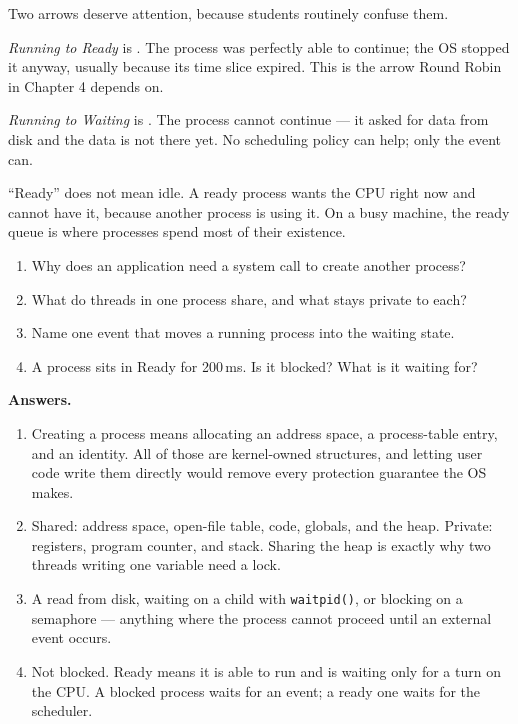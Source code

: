 Two arrows deserve attention, because students routinely confuse them.

\emph{Running to Ready} is . The process was perfectly able to continue; the OS stopped it anyway, usually because its time slice expired. This is the arrow Round Robin in Chapter 4 depends on.

\emph{Running to Waiting} is . The process cannot continue --- it asked for data from disk and the data is not there yet. No scheduling policy can help; only the event can.

\begin{pitfall}
``Ready'' does not mean idle. A ready process wants the CPU right now and cannot have it, because another process is using it. On a busy machine, the ready queue is where processes spend most of their existence.
\end{pitfall}

\begin{quickcheck}
\begin{enumerate}
  \item Why does an application need a system call to create another process?
  \item What do threads in one process share, and what stays private to each?
  \item Name one event that moves a running process into the waiting state.
  \item A process sits in Ready for 200\,ms. Is it blocked? What is it waiting for?
\end{enumerate}

\medskip\noindent\textbf{Answers.}
\begin{enumerate}
  \item Creating a process means allocating an address space, a process-table entry, and an identity. All of those are kernel-owned structures, and letting user code write them directly would remove every protection guarantee the OS makes.
  \item Shared: address space, open-file table, code, globals, and the heap. Private: registers, program counter, and stack. Sharing the heap is exactly why two threads writing one variable need a lock.
  \item A read from disk, waiting on a child with \texttt{waitpid()}, or blocking on a semaphore --- anything where the process cannot proceed until an external event occurs.
  \item Not blocked. Ready means it is able to run and is waiting only for a turn on the CPU. A blocked process waits for an event; a ready one waits for the scheduler.
\end{enumerate}
\end{quickcheck}
